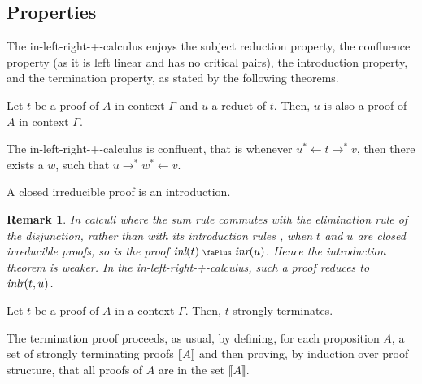 \documentclass[screen, sigconf,authorversion,nonacm]{acmart}
\theoremstyle{acmdefinition}
\newtheorem{remark}[theorem]{Remark}}
\numberwithin{equation}{section}
\newcommand\inl{\mbox{\it inl}}
\newcommand\inr{\mbox{\it inr}}
\newcommand\inlr{\mbox{\it inlr}}
\newcommand\plus{\mathrel{\text{\normalfont\scalebox{0.7}{\faPlus}}}}
\newcommand\lra{\longrightarrow}
\newcommand\lras{\lra^*}
\newcommand\llas{\mathrel{{}^*{\longleftarrow}}}
\begin{document}
  
\subsection{Properties}
\label{subsec:subrefd}

The in-left-right-+-calculus enjoys the subject reduction property,
the confluence property (as it is left linear and has no critical
pairs), the introduction property, and the termination property, as
stated by the following theorems.

\begin{theorem}
\label{thm:SR}
Let $t$ be a proof of $A$ in context $\Gamma$ and $u$ a reduct of
$t$. Then, $u$ is also a proof of $A$ in context $\Gamma$.
\end{theorem}

\begin{theorem}[Confluence]
\label{th:Confluence}
The in-left-right-+-calculus is confluent, that is whenever $u \llas t
\lras v$, then there exists a $w$, such that $u \lras w \llas v$.
\end{theorem}

\begin{theorem}[Introduction]
\label{introductions}
A closed irreducible proof is an introduction.
\end{theorem}

\begin{remark}
In calculi where the sum rule commutes with the elimination rule of
the disjunction, rather than with its introduction rules
\cite{DiazcaroDowekTCS23,DiazcaroDowekMSCS24}, when $t$ and $u$ are
closed irreducible proofs, so is the proof $\inl(t) \plus
\inr(u)$. Hence the introduction theorem is weaker. In the
in-left-right-+-calculus, such a proof reduces to $\inlr(t,u)$.
\end{remark}

\begin{theorem}[Termination]
\label{th:Term} 
Let $t$ be a proof of $A$ in a context $\Gamma$. Then, $t$ strongly
terminates.
\end{theorem}

The termination proof proceeds, as usual, by defining, for each
proposition $A$, a set of strongly terminating proofs $\llbracket A
\rrbracket$ and then proving, by induction over proof structure, that
all proofs of $A$ are in the set $\llbracket A \rrbracket$.
\end{document}

